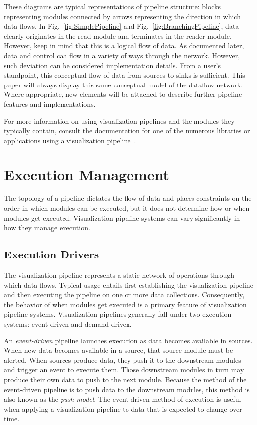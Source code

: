 \documentclass[journal,twocolumn,10pt,letterpaper,twoside]{IEEEtran}
\newcommand*{\lcite}[1]{~\cite{#1}}
\newcommand*{\figref}[1]{Fig.~\ref{#1}}
\newcommand*{\keyterm}[1]{\emph{#1}}
\begin{document}
These diagrams are typical representations of pipeline structure: blocks
representing modules connected by arrows representing the direction in
which data flows.  In \figref{fig:SimplePipeline} and
\figref{fig:BranchingPipeline}, data clearly originates in the read module
and terminates in the render module.  However, keep in mind that this is a
logical flow of data.  As documented later, data and control can flow in a
variety of ways through the network.  However, such deviation can be
considered implementation details.  From a user's standpoint, this
conceptual flow of data from sources to sinks is sufficient.  This paper
will always display this same conceptual model of the dataflow network.
Where appropriate, new elements will be attached to describe further
pipeline features and implementations.

For more information on using visualization pipelines and the modules
they typically contain, consult the documentation for one of the numerous
libraries or applications using a visualization
pipeline\lcite{VTK,ParaView,ParaViewTutorial,SCIRunUserGuide,IRISExplorerUsersGuide,VisTrailsDocumentation,OpenDXGuide}.


\section{Execution Management}
\label{sec:ExecutionManagement}

The topology of a pipeline dictates the flow of data and places constraints
on the order in which modules can be executed, but it does not determine
how or when modules get executed.  Visualization pipeline systems can
vary significantly in how they manage execution.

\subsection{Execution Drivers}
\label{sec:ExecutionDrivers}

The visualization pipeline represents a static network of operations
through which data flows.  Typical usage entails first establishing the
visualization pipeline and then executing the pipeline on one or more data
collections.  Consequently, the behavior of when modules get executed is
a primary feature of visualization pipeline systems.  Visualization
pipelines generally fall under two execution systems: event driven and
demand driven.

An \keyterm{event-driven} pipeline launches execution as data becomes
available in sources.  When new data becomes available in a source, that
source module must be alerted.  When sources produce data, they push it
to the downstream modules and trigger an event to execute them.  Those
downstream modules in turn may produce their own data to push to the
next module.  Because the method of the event-driven pipeline is to push
data to the downstream modules, this method is also known as the
\keyterm{push model}.  The event-driven method of execution is useful when
applying a visualization pipeline to data that is expected to change over
time.
\end{document}
